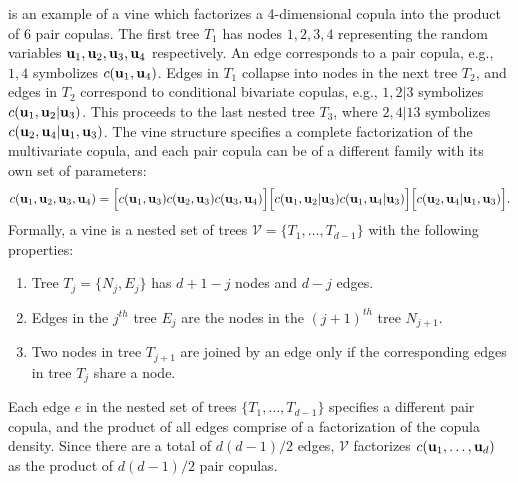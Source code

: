  is an example of a vine which factorizes a
4-dimensional copula into the product of 6 pair copulas. The first
tree $T_1$ has nodes $1,2,3,4$ representing the random variables
$\boldsymbol{\mathbf{u}}_1,\boldsymbol{\mathbf{u}}_2,\boldsymbol{\mathbf{u}}_3,\boldsymbol{\mathbf{u}}_4$ respectively. An edge corresponds
to a pair copula, e.g., $1,4$ symbolizes $c(\boldsymbol{\mathbf{u}}_1,\boldsymbol{\mathbf{u}}_4)$. Edges in
$T_1$ collapse into nodes in the next tree $T_2$, and edges in $T_2$
correspond to conditional bivariate copulas, e.g., $1,2|3$ symbolizes
$c(\boldsymbol{\mathbf{u}}_1,\boldsymbol{\mathbf{u}}_2|\boldsymbol{\mathbf{u}}_3)$. This proceeds to the last
nested tree $T_3$, where $2,4|13$ symbolizes
$c(\boldsymbol{\mathbf{u}}_2,\boldsymbol{\mathbf{u}}_4|\boldsymbol{\mathbf{u}}_1,\boldsymbol{\mathbf{u}}_3)$. The vine structure specifies a
complete factorization of the multivariate copula, and each pair
copula can be of a different family with its own set of parameters:
\begin{align*}
c(\boldsymbol{\mathbf{u}}_1,\boldsymbol{\mathbf{u}}_2,\boldsymbol{\mathbf{u}}_3,\boldsymbol{\mathbf{u}}_4) =
\Big[c(\boldsymbol{\mathbf{u}}_1,\boldsymbol{\mathbf{u}}_3)c(\boldsymbol{\mathbf{u}}_2,\boldsymbol{\mathbf{u}}_3)c(\boldsymbol{\mathbf{u}}_3,\boldsymbol{\mathbf{u}}_4)\Big]
\Big[c(\boldsymbol{\mathbf{u}}_1,\boldsymbol{\mathbf{u}}_2|\boldsymbol{\mathbf{u}}_3)c(\boldsymbol{\mathbf{u}}_1,\boldsymbol{\mathbf{u}}_4|\boldsymbol{\mathbf{u}}_3)\Big]
\Big[c(\boldsymbol{\mathbf{u}}_2,\boldsymbol{\mathbf{u}}_4|\boldsymbol{\mathbf{u}}_1,\boldsymbol{\mathbf{u}}_3)\Big].
\end{align*}
%
Formally, a vine is a nested set of trees
$\mathcal{V} = \{T_1,\ldots, T_{d-1}\}$ with the following
properties:
\begin{enumerate}
\item Tree $T_j=\{N_j,E_j\}$ has $d+1-j$ nodes and $d-j$ edges.
\item Edges in the $j^{th}$ tree $E_j$ are the nodes in the $(j+1)^{th}$ tree $N_{j+1}$.
\item %
Two nodes in tree $T_{j+1}$ are joined by an edge only if the corresponding edges in tree $T_{j}$ share a node.
\end{enumerate}
%
Each edge $e$ in the nested set of trees $\{T_1,\ldots,T_{d-1}\}$
specifies a different pair copula, and the product of all edges
comprise of a factorization of the copula density. Since there are a
total of $d(d-1)/2$ edges, $\mathcal{V}$ factorizes
$c(\boldsymbol{\mathbf{u}}_1,\ldots,\boldsymbol{\mathbf{u}}_d)$ as the product of $d(d-1)/2$ pair copulas.

